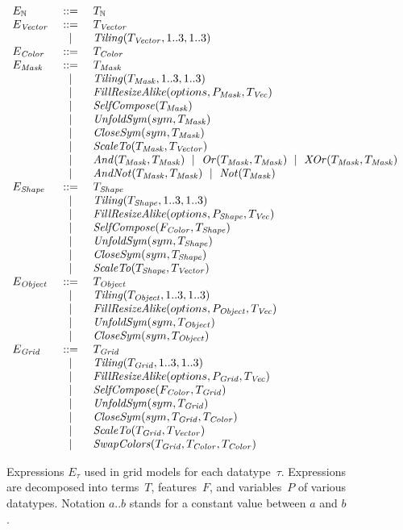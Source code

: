 \documentclass[a4paper]{llncs}
\newenvironment{datatype}{$\begin{array}{lcl}}{\end{array}$}
\newcommand{\is}{&\ ::=\ &}
\newcommand{\alter}{\ \mid\ }
\newcommand{\altis}{\\ &\ \mid\ &}
\newcommand{\nat}{\mathbb{N}}
\begin{document}
\begin{figure}[t!]
\begin{center}
  \begin{datatype}
    E_\nat \is T_\nat
    \\
    E_{\it Vector} \is T_{\it Vector}
    \altis {\it Tiling}(T_{\it Vector}, 1..3, 1..3)
    \\
    E_{\it Color} \is T_{\it Color}
    \\
    E_{\it Mask} \is T_{\it Mask}
    \altis {\it Tiling}(T_{\it Mask}, 1..3, 1..3)
    \altis {\it FillResizeAlike}(options, P_{\it Mask}, T_{\it Vec})
    \altis {\it SelfCompose}(T_{\it Mask})
    \altis {\it UnfoldSym}(sym,T_{\it Mask})
    \altis {\it CloseSym}(sym,T_{\it Mask})
    \altis {\it ScaleTo}(T_{\it Mask},T_{\it Vector})
    \altis {\it And}(T_{\it Mask},T_{\it Mask}) \alter {\it Or}(T_{\it Mask},T_{\it Mask}) \alter {\it XOr}(T_{\it Mask},T_{\it Mask})
    \altis {\it AndNot}(T_{\it Mask},T_{\it Mask}) \alter {\it Not}(T_{\it Mask})
    \\
    E_{\it Shape} \is T_{\it Shape}
    \altis {\it Tiling}(T_{\it Shape}, 1..3, 1..3)
    \altis {\it FillResizeAlike}(options, P_{\it Shape}, T_{\it Vec})
    \altis {\it SelfCompose}(F_{\it Color}, T_{\it Shape})
    \altis {\it UnfoldSym}(sym,T_{\it Shape})
    \altis {\it CloseSym}(sym,T_{\it Shape})
    \altis {\it ScaleTo}(T_{\it Shape},T_{\it Vector})
    \\
    E_{\it Object} \is T_{\it Object}
    \altis {\it Tiling}(T_{\it Object}, 1..3, 1..3)
    \altis {\it FillResizeAlike}(options, P_{\it Object}, T_{\it Vec})
    \altis {\it UnfoldSym}(sym,T_{\it Object})
    \altis {\it CloseSym}(sym,T_{\it Object})
    \\
    E_{\it Grid} \is T_{\it Grid}
    \altis {\it Tiling}(T_{\it Grid}, 1..3, 1..3)
    \altis {\it FillResizeAlike}(options, P_{\it Grid}, T_{\it Vec})
    \altis {\it SelfCompose}(F_{\it Color}, T_{\it Grid})
    \altis {\it UnfoldSym}(sym,T_{\it Grid})
    \altis {\it CloseSym}(sym,T_{\it Grid},T_{\it Color})
    \altis {\it ScaleTo}(T_{\it Grid},T_{\it Vector})
    \altis {\it SwapColors}(T_{\it Grid},T_{\it Color},T_{\it Color})
  \end{datatype}
\end{center}
\caption{Expressions $E_\tau$ used in grid models for each
  datatype~$\tau$. Expressions are decomposed into terms~$T$, features~$F$, and
  variables~$P$ of various datatypes. Notation $a..b$ stands for
  a constant value between $a$ and $b$.}
\label{fig:expressions}
\end{figure}
\end{document}
